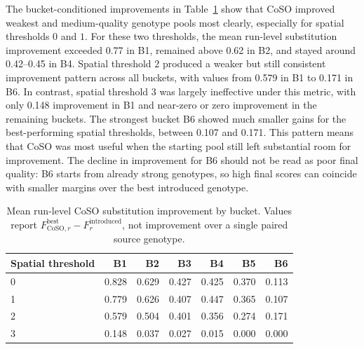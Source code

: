 The bucket-conditioned improvements in Table~\ref{tab:coso-bucket-improvement} show that CoSO improved weakest and medium-quality genotype pools most clearly, especially for spatial thresholds \(0\) and \(1\). For these two thresholds, the mean run-level substitution improvement exceeded 0.77 in B1, remained above 0.62 in B2, and stayed around 0.42--0.45 in B4. Spatial threshold \(2\) produced a weaker but still consistent improvement pattern across all buckets, with values from 0.579 in B1 to 0.171 in B6. In contrast, spatial threshold \(3\) was largely ineffective under this metric, with only 0.148 improvement in B1 and near-zero or zero improvement in the remaining buckets. The strongest bucket B6 showed much smaller gains for the best-performing spatial thresholds, between 0.107 and 0.171. This pattern means that CoSO was most useful when the starting pool still left substantial room for improvement. The decline in improvement for B6 should not be read as poor final quality: B6 starts from already strong genotypes, so high final scores can coincide with smaller margins over the best introduced genotype.


\begin{table}[H]
\centering
\caption{Mean run-level CoSO substitution improvement by bucket. Values report \(F^{\mathrm{best}}_{\mathrm{CoSO},r} - F^{\mathrm{introduced}}_{r}\), not improvement over a single paired source genotype.}
\label{tab:coso-bucket-improvement}
{\small
\begin{tabular}{lrrrrrr}
\hline
Spatial threshold & B1 & B2 & B3 & B4 & B5 & B6 \\
\hline

0 & 0.828 & 0.629 & 0.427 & 0.425 & 0.370 & 0.113 \\
1 & 0.779 & 0.626 & 0.407 & 0.447 & 0.365 & 0.107 \\
2 & 0.579 & 0.504 & 0.401 & 0.356 & 0.274 & 0.171 \\
3 & 0.148 & 0.037 & 0.027 & 0.015 & 0.000 & 0.000 \\
\hline
\end{tabular}}
\end{table}

